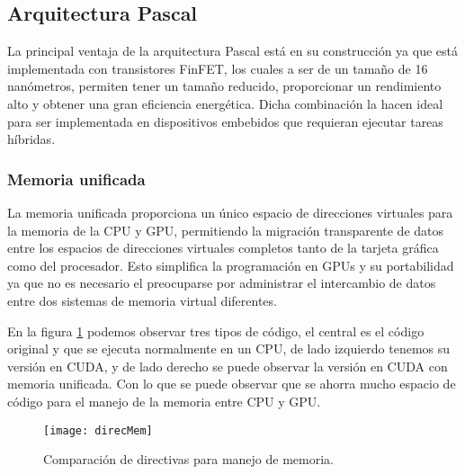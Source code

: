     \subsection{Arquitectura Pascal}

    La principal ventaja de la arquitectura Pascal está en su construcción ya que está implementada con transistores FinFET\cite{PasGPU}, los cuales a ser de un tamaño de 16 nanómetros, permiten tener un tamaño reducido, proporcionar un rendimiento alto y obtener una gran eficiencia energética. Dicha combinación la hacen ideal para ser implementada en dispositivos embebidos que requieran ejecutar tareas híbridas.
                 
   \vspace{0.3cm}
   
    \subsubsection{Memoria unificada} \label{sec:MemUni}
     La memoria unificada proporciona un único espacio de direcciones virtuales para la memoria de la \acrshort{CPU} y \acrshort{GPU}, permitiendo la migración transparente de datos entre los espacios de direcciones virtuales completos tanto de la tarjeta gráfica como del procesador. Esto simplifica la programación en \acrshort{GPU}s y su portabilidad ya que no es necesario el  preocuparse por administrar el intercambio de datos entre dos sistemas de memoria virtual diferentes\cite{WPNV}.
                 
   \vspace{0.3cm}
   
     En la figura \ref{fig:direcMem} podemos observar tres tipos de código, el central es el código original y que se ejecuta normalmente en un CPU, de lado izquierdo tenemos su versión en CUDA, y de lado derecho se puede observar la versión en CUDA con memoria unificada. Con lo que se puede observar que se ahorra mucho espacio de código para el manejo de la memoria entre CPU y GPU.
       
  \begin{figure}[ht]
      \centering
        \texttt{[image: direcMem]}
        \caption{Comparación de directivas para manejo de memoria.}
        \label{fig:direcMem}
    \end{figure}
     
     
